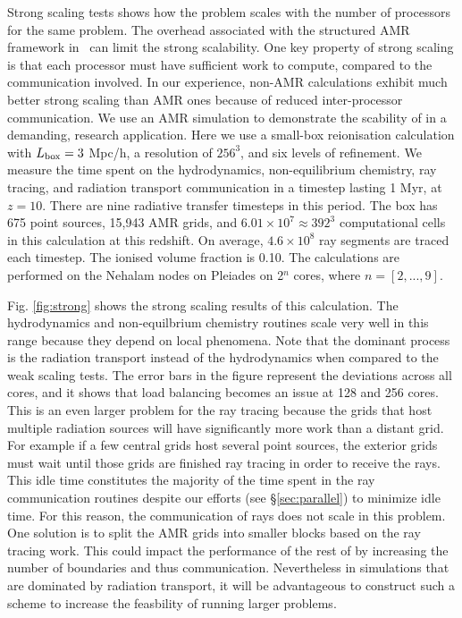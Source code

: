 \documentclass[useAMS,usenatbib]{mn2e}
\begin{document}
Strong scaling tests shows how the problem scales with the number of
processors for the same problem.  The overhead associated with the
structured AMR framework in \enzo~can limit the strong scalability.
One key property of strong scaling is that each processor must have
sufficient work to compute, compared to the communication involved.
In our experience, non-AMR calculations exhibit much better strong
scaling than AMR ones because of reduced inter-processor
communication.  We use an AMR simulation to demonstrate the scability
of \moray in a demanding, research application.  Here we use a
small-box reionisation calculation with $L_{\rm box} = 3$ Mpc/h, a
resolution of $256^3$, and six levels of refinement.  We measure the
time spent on the hydrodynamics, non-equilibrium chemistry, ray
tracing, and radiation transport communication in a timestep lasting 1
Myr, at $z=10$.  There are nine radiative transfer timesteps in this
period.  The box has 675 point sources, 15,943 AMR grids, and $6.01
\times 10^7 \approx 392^3$ computational cells in this calculation at
this redshift.  On average, $4.6 \times 10^8$ ray segments are traced
each timestep.  The ionised volume fraction is 0.10.  The calculations
are performed on the Nehalam nodes on Pleiades on 2$^n$ cores, where
$n = [2,...,9]$.

Fig. \ref{fig:strong} shows the strong scaling results of this
calculation.  The hydrodynamics and non-equilbrium chemistry routines
scale very well in this range because they depend on local phenomena.
Note that the dominant process is the radiation transport instead of
the hydrodynamics when compared to the weak scaling tests.  The error
bars in the figure represent the deviations across all cores, and it
shows that load balancing becomes an issue at 128 and 256 cores.  This
is an even larger problem for the ray tracing because the grids that
host multiple radiation sources will have significantly more work than
a distant grid.  For example if a few central grids host several point
sources, the exterior grids must wait until those grids are finished
ray tracing in order to receive the rays.  This idle time constitutes
the majority of the time spent in the ray communication routines
despite our efforts (see \S\ref{sec:parallel}) to minimize idle time.
For this reason, the communication of rays does not scale in this
problem.  One solution is to split the AMR grids into smaller blocks
based on the ray tracing work.  This could impact the performance of
the rest of \enzo by increasing the number of boundaries and thus
communication.  Nevertheless in simulations that are dominated by
radiation transport, it will be advantageous to construct such a
scheme to increase the feasbility of running larger problems.
\end{document}
